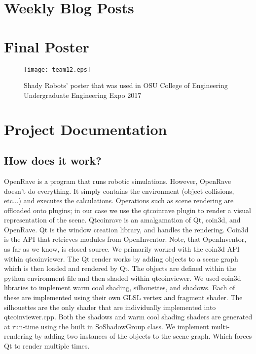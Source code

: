 \documentclass[10pt,journal,compsoc,draftclsnofoot]{IEEEtran}
\begin{document}
\begin{flushleft}
\begin{center}
\begin{table}[H]
\begin{tabular}{ | p{0.2\linewidth} | p{0.2\linewidth} | p{0.5\linewidth} | }
\end{tabular}
\newline
\label{table:TechReviewUpdate}
\end{table}
\end{center}

\newpage

\section{Weekly Blog Posts}


\section{Final Poster}
\vfill
\begin{figure} [h]
  \texttt{[image: team12.eps]}
  \caption
{ \newline \hspace{\linewidth}
Shady Robots' poster that was used in OSU College of Engineering Undergraduate Engineering Expo 2017}
  \label{fig:poster}
\end{figure}
\vfill
\newpage

\section{Project Documentation}

\subsection{How does it work?}

OpenRave is a program that runs robotic simulations.
However, OpenRave doesn't do everything.
It simply contains the environment (object collisions, etc...) and executes the calculations.
Operations such as scene rendering are offloaded onto plugins; in our case we use the qtcoinrave plugin to render a visual representation of the scene.
Qtcoinrave is an amalgamation of Qt, coin3d, and OpenRave.
Qt is the window creation library, and handles the rendering.
Coin3d is the API that retrieves modules from OpenInventor.
Note, that OpenInventor, as far as we know, is closed source.
We primarily worked with the coin3d API within qtcoinviewer.
The Qt render works by adding objects to a scene graph which is then loaded and rendered by Qt.
The objects are defined within the python environment file and then shaded within qtcoinviewer.
We used coin3d libraries to implement warm cool shading, silhouettes, and shadows.
Each of these are implemented using their own GLSL vertex and fragment shader.
The silhouettes are the only shader that are individually implemented into qtcoinviewer.cpp.
Both the shadows and warm cool shading shaders are generated at run-time using the built in SoShadowGroup class.
We implement multi-rendering by adding two instances of the objects to the scene graph.
Which forces Qt to render multiple times.


\end{flushleft}
\end{document}

